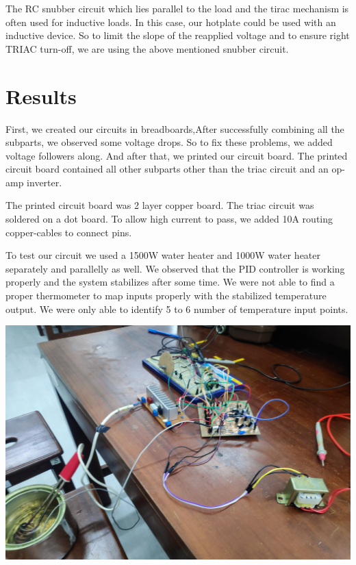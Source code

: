 \begin{multicols}{2}
The RC snubber circuit which lies parallel to the load and the tirac mechanism is often used for inductive loads. In this case, our hotplate could be used with an inductive device. So to limit the slope of the reapplied voltage and to ensure right TRIAC turn-off, we are using the above mentioned snubber circuit.

{\let\clearpage\relax \chapter{Results}}
First, we created our circuits in breadboards,After successfully combining all the subparts, we observed some voltage drops. So to fix these problems, we added voltage followers along. And after that, we printed our circuit board. 
The printed circuit board contained all other subparts other than the triac circuit and an op-amp inverter.

The printed circuit board was 2 layer copper board. The triac circuit was soldered on a dot board. To allow high current to pass, we added 10A routing copper-cables to connect pins.

To test our circuit we used a 1500W water heater and 1000W water heater separately and parallelly as well. We observed that the PID controller is working properly and the system stabilizes after some time. We were not able to find a proper thermometer to map inputs properly with the stabilized temperature output. We were only able to identify 5 to 6 number of temperature input points. 

\begin{minipage}{0.45\textwidth}
\centering
\includegraphics[width=\textwidth]{PCB fabricated/Final.jpg}
\end{minipage}


\end{multicols}
